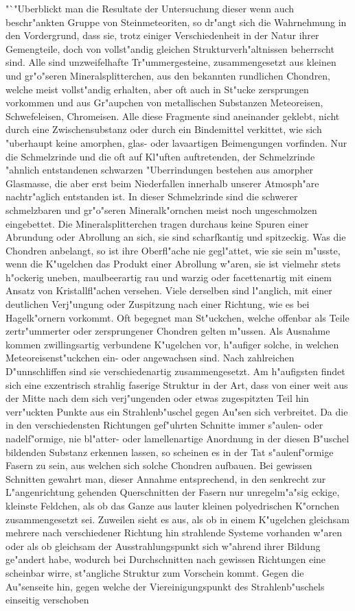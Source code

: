 \documentclass[a4paper, 11pt, oneside]{article}
\begin{document}
"`"Uberblickt man die Resultate der Untersuchung dieser wenn auch beschr"ankten Gruppe von Steinmeteoriten, so dr"angt sich die Wahrnehmung in den Vordergrund, dass sie, trotz einiger Verschiedenheit in der Natur ihrer Gemengteile, doch von vollst"andig gleichen Strukturverh"altnissen beherrscht sind. Alle sind unzweifelhafte Tr"ummergesteine, zusammengesetzt aus kleinen und gr"o"seren Mineralsplitterchen, aus den bekannten rundlichen Chondren, welche meist vollst"andig erhalten, aber oft auch in St"ucke zersprungen vorkommen und aus Gr"aupchen von metallischen Substanzen Meteoreisen, Schwefeleisen, Chromeisen. Alle diese Fragmente sind aneinander geklebt, nicht durch eine Zwischensubstanz oder durch ein Bindemittel verkittet, wie sich "uberhaupt keine amorphen, glas- oder lavaartigen Beimengungen vorfinden. Nur die Schmelzrinde und die oft auf Kl"uften auftretenden, der Schmelzrinde "ahnlich entstandenen schwarzen "Uberrindungen bestehen aus amorpher Glasmasse, die aber erst beim Niederfallen innerhalb unserer Atmosph"are nachtr"aglich entstanden ist. In dieser Schmelzrinde sind die schwerer schmelzbaren und gr"o"seren Mineralk"ornchen meist noch ungeschmolzen eingebettet. Die Mineralsplitterchen tragen durchaus keine Spuren einer Abrundung oder Abrollung an sich, sie sind scharfkantig und spitzeckig. Was die Chondren anbelangt, so ist ihre Oberfl"ache nie gegl"attet, wie sie sein m"usste, wenn die K"ugelchen das Produkt einer Abrollung w"aren, sie ist vielmehr stets h"ockerig uneben, maulbeerartig rau und warzig oder facettenartig mit einem Ansatz von Kristallfl"achen versehen. Viele derselben sind l"anglich, mit einer deutlichen Verj"ungung oder Zuspitzung nach einer Richtung, wie es bei Hagelk"ornern vorkommt. Oft begegnet man St"uckchen, welche offenbar als Teile zertr"ummerter oder zersprungener Chondren gelten m"ussen. Als Ausnahme kommen zwillingsartig verbundene K"ugelchen vor, h"aufiger solche, in welchen Meteoreisenst"uckchen ein- oder angewachsen sind. Nach zahlreichen D"unnschliffen sind sie verschiedenartig zusammengesetzt. Am h"aufigsten findet sich eine exzentrisch strahlig faserige Struktur in der Art, dass von einer weit aus der Mitte nach dem sich verj"ungenden oder etwas zugespitzten Teil hin verr"uckten Punkte aus ein Strahlenb"uschel gegen Au"sen sich verbreitet. Da die in den verschiedensten Richtungen gef"uhrten Schnitte immer s"aulen- oder nadelf"ormige, nie bl"atter- oder lamellenartige Anordnung in der diesen B"uschel bildenden Substanz erkennen lassen, so scheinen es in der Tat s"aulenf"ormige Fasern zu sein, aus welchen sich solche Chondren aufbauen. Bei gewissen Schnitten gewahrt man, dieser Annahme entsprechend, in den senkrecht zur L"angenrichtung gehenden Querschnitten der Fasern nur unregelm"a"sig eckige, kleinste Feldchen, als ob das Ganze aus lauter kleinen polyedrischen K"ornchen zusammengesetzt sei. Zuweilen sieht es aus, als ob in einem K"ugelchen gleichsam mehrere nach verschiedener Richtung hin strahlende Systeme vorhanden w"aren oder als ob gleichsam der Ausstrahlungspunkt sich w"ahrend ihrer Bildung ge"andert habe, wodurch bei Durchschnitten nach gewissen Richtungen eine scheinbar wirre, st"angliche Struktur zum Vorschein kommt. Gegen die Au"senseite hin, gegen welche der Viereinigungspunkt des Strahlenb"uschels einseitig verschoben 
\end{document}

